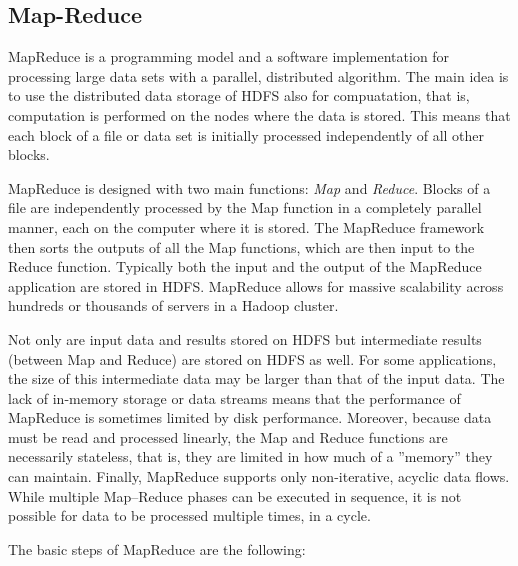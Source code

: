 \subsection{Map-Reduce}

MapReduce is a programming model and a software implementation for processing large data sets with a parallel, distributed algorithm. The main idea is to use the distributed data storage of HDFS also for compuatation, that is, computation is performed on the nodes where the data is stored. This means that each block of a file or data set is initially processed independently of all other blocks.

MapReduce is designed with two main functions: \emph{Map} and \emph{Reduce}. Blocks of a file are independently processed by the Map function in a completely parallel manner, each on the computer where it is stored. The MapReduce framework then sorts the outputs of all the Map functions, which are then input to the Reduce function. Typically both the input and the output of the MapReduce application are stored in HDFS. MapReduce allows for massive scalability across hundreds or thousands of servers in a Hadoop cluster.

Not only are input data and results stored on HDFS but intermediate results (between Map and Reduce) are stored on HDFS as well. For some applications, the size of this intermediate data may be larger than that of the input data. The lack of in-memory storage or data streams means that the performance of MapReduce is sometimes limited by disk performance. Moreover, because data must be read and processed linearly, the Map and Reduce functions are necessarily stateless, that is, they are limited in how much of a ''memory'' they can maintain. Finally, MapReduce supports only non-iterative, acyclic data flows. While multiple Map--Reduce phases can be executed in sequence, it is not possible for data to be processed multiple times, in a cycle. 

The basic steps of MapReduce are the following:

